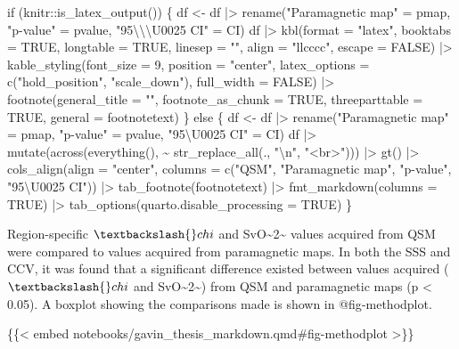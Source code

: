 \documentclass[
  letterpaper,
  DIV=11,
  numbers=noendperiod]{scrartcl}
\newenvironment{Shaded}{\begin{snugshade}}{\end{snugshade}}
\newcommand{\NormalTok}[1]{\textcolor[rgb]{0.00,0.23,0.31}{#1}}
\begin{document}
\begin{Shaded}
\begin{Highlighting}[]
\NormalTok{if (knitr::is\_latex\_output()) \{}
\NormalTok{df \textless{}{-} df |\textgreater{} rename("Paramagnetic map" = pmap, "p{-}value" = pvalue, "95\textbackslash{}\textbackslash{}\textbackslash{}U0025 CI" = CI)}
\NormalTok{df |\textgreater{}}
\NormalTok{  kbl(format = "latex",}
\NormalTok{    booktabs = TRUE,}
\NormalTok{    longtable = TRUE,}
\NormalTok{    linesep = "",}
\NormalTok{    align = "llcccc",}
\NormalTok{    escape = FALSE) |\textgreater{}}
\NormalTok{    kable\_styling(font\_size = 9, position = "center", latex\_options = c("hold\_position", "scale\_down"), full\_width = FALSE) |\textgreater{}}
\NormalTok{    footnote(general\_title = "", }
\NormalTok{           footnote\_as\_chunk = TRUE,}
\NormalTok{           threeparttable = TRUE,}
\NormalTok{           general = footnotetext)}
\NormalTok{\} else \{}
\NormalTok{df \textless{}{-} df |\textgreater{} rename("Paramagnetic map" = pmap, "p{-}value" = pvalue, "95\textbackslash{}U0025 CI" = CI)}
\NormalTok{df |\textgreater{} }
\NormalTok{    mutate(across(everything(), \textasciitilde{} str\_replace\_all(., "\textbackslash{}n", "\textless{}br\textgreater{}"))) |\textgreater{} }
\NormalTok{    gt() |\textgreater{} }
\NormalTok{    cols\_align(align = "center", columns = c("QSM", "Paramagnetic map", "p{-}value", "95\textbackslash{}U0025 CI")) |\textgreater{}}
\NormalTok{    tab\_footnote(footnotetext) |\textgreater{}}
\NormalTok{    fmt\_markdown(columns = TRUE) |\textgreater{}}
\NormalTok{    tab\_options(quarto.disable\_processing = TRUE)}
\NormalTok{\}}
\NormalTok{\textasciigrave{}\textasciigrave{}\textasciigrave{}}

\NormalTok{Region{-}specific $\textbackslash{}chi$ and SvO\textasciitilde{}2\textasciitilde{} values acquired from QSM were compared to values acquired from paramagnetic maps. In both the SSS and CCV, it was found that a significant difference existed between values acquired ($\textbackslash{}chi$ and SvO\textasciitilde{}2\textasciitilde{}) from QSM and paramagnetic maps (p \textless{} 0.05). A boxplot showing the comparisons made is shown in @fig{-}methodplot.}

\NormalTok{\{\{\textless{} embed notebooks/gavin\_thesis\_markdown.qmd\#fig{-}methodplot \textgreater{}\}\}}


\end{Highlighting}
\end{Shaded}
\end{document}
